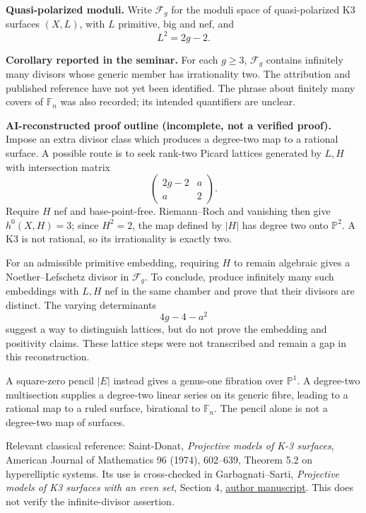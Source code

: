 \medskip\noindent
{\bf Quasi-polarized moduli.}
Write $\mathcal{F}_g$ for the moduli
space of quasi-polarized K3 surfaces
$(X,L)$, with $L$ primitive, big and nef,
and
$$
L^2=2g-2.
$$

\medskip\noindent
{\bf Corollary reported in the seminar.}
For each $g\geq3$, $\mathcal{F}_g$
contains infinitely many divisors whose
generic member has irrationality two.
The attribution and published reference
have not yet been identified.
The phrase about finitely many covers
of $\mathbb{F}_n$ was also recorded;
its intended quantifiers are unclear.

\medskip\noindent
{\bf AI-reconstructed proof outline
(incomplete, not a verified proof).}
Impose an extra divisor class which
produces a degree-two map to a rational
surface. A possible route is to seek
rank-two Picard lattices generated by
$L,H$ with intersection matrix
$$
\begin{pmatrix}
2g-2&a\\
a&2
\end{pmatrix}.
$$
Require $H$ nef and base-point-free.
Riemann--Roch and vanishing then give
$h^0(X,H)=3$; since $H^2=2$, the map
defined by $|H|$ has degree two onto
$\mathbb{P}^2$. A K3 is not rational,
so its irrationality is exactly two.

For an admissible primitive embedding,
requiring $H$ to remain algebraic gives
a Noether--Lefschetz divisor in
$\mathcal{F}_g$. To conclude, produce
infinitely many such embeddings with
$L,H$ nef in the same chamber and prove
that their divisors are distinct.
The varying determinants
$$
4g-4-a^2
$$
suggest a way to distinguish lattices,
but do not prove the embedding and
positivity claims. These lattice steps
were not transcribed and remain a gap
in this reconstruction.

A square-zero pencil $|E|$ instead
gives a genus-one fibration over
$\mathbb{P}^1$. A degree-two
multisection supplies a degree-two
linear series on its generic fibre,
leading to a rational map to a ruled
surface, birational to $\mathbb{F}_n$.
The pencil alone is not a degree-two
map of surfaces.

Relevant classical reference:
Saint-Donat, {\it Projective models
of K-3 surfaces}, American Journal
of Mathematics 96 (1974), 602--639,
Theorem 5.2 on hyperelliptic systems.
Its use is cross-checked in
Garbagnati--Sarti,
{\it Projective models of K3 surfaces
with an even set}, Section 4,
\href{https://sarti.pages.math.cnrs.fr/%
home/ottonodali1312.pdf}
{author manuscript}.
This does not verify the infinite-divisor
assertion.

